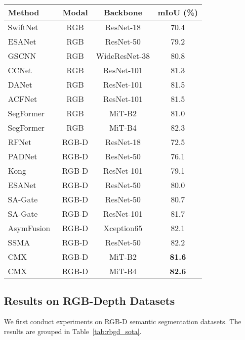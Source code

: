 \documentclass[journal]{IEEEtran}
\begin{document}
\begin{table*}[!t]
\begin{subtable}[t]{0.7\columnwidth}
{    \renewcommand{\arraystretch}{1.40}
        \begin{tabular}{l|cc|c}
        \toprule
        \textbf{Method}& \textbf{Modal} & \textbf{Backbone} & \textbf{mIoU (\%) } \\
        \midrule\midrule
        SwiftNet~\cite{orsic2019swiftnet} & RGB & ResNet-18 & 70.4 \\
        ESANet~\cite{seichter2020efficient} & RGB & ResNet-50 & 79.2 \\
        GSCNN~\cite{takikawa2019gated_scnn} &RGB &WideResNet-38& 80.8 \\
        CCNet~\cite{huang2019ccnet} &RGB &ResNet-101& 81.3 \\
        DANet~\cite{fu2019danet} &RGB&ResNet-101& 81.5 \\
        ACFNet~\cite{zhang2019acfnet}&RGB&ResNet-101 & 81.5 \\
        SegFormer~\cite{xie2021segformer}& RGB & MiT-B2 & 81.0 \\
        SegFormer~\cite{xie2021segformer}& RGB & MiT-B4 & 82.3 \\
        \midrule
        RFNet~\cite{sun2020rfnet} & RGB-D & ResNet-18 & 72.5 \\
        PADNet~\cite{xu2018padnet} &RGB-D & ResNet-50& 76.1 \\
        Kong ~\cite{kong2018recurrent}&RGB-D&ResNet-101 & 79.1 \\
        ESANet~\cite{seichter2020efficient} & RGB-D & ResNet-50 & 80.0 \\
        SA-Gate~\cite{chen2020sa_gate}  &RGB-D& ResNet-50 & 80.7 \\
        SA-Gate~\cite{chen2020sa_gate}  &RGB-D& ResNet-101& 81.7 \\
        AsymFusion~\cite{wang2020channel_shuffle} &RGB-D& Xception65 & 82.1 \\
        SSMA~\cite{valada2019ssma} &RGB-D& ResNet-50 & 82.2 \\
        \midrule
        CMX & RGB-D & MiT-B2 & \textbf{81.6} \\
        \rowcolor{gray!15} CMX & RGB-D & MiT-B4 & \textbf{82.6} \\
        \bottomrule
        \end{tabular}
    }
    \end{subtable}\end{table*} 
\subsection{Results on RGB-Depth Datasets}
\label{sec:results_rgbd}
We first conduct experiments on RGB-D semantic segmentation datasets. The results are grouped in Table~\ref{tab:rbgd_sota}.
\end{document}
